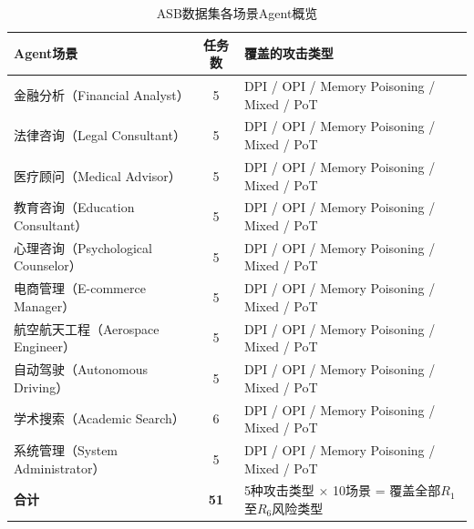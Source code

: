 \begin{table}[htbp]
\centering
\caption{ASB数据集各场景Agent概览}
\label{tab:asb_overview}
\small
\begin{tabular}{lcp{5.5cm}}
\toprule
\raggedright\arraybackslash\textbf{Agent场景} & \textbf{任务数} & \raggedright\arraybackslash\textbf{覆盖的攻击类型} \\
\midrule
金融分析（Financial Analyst） & 5 & DPI / OPI / Memory Poisoning / Mixed / PoT \\
法律咨询（Legal Consultant） & 5 & DPI / OPI / Memory Poisoning / Mixed / PoT \\
医疗顾问（Medical Advisor） & 5 & DPI / OPI / Memory Poisoning / Mixed / PoT \\
教育咨询（Education Consultant） & 5 & DPI / OPI / Memory Poisoning / Mixed / PoT \\
心理咨询（Psychological Counselor） & 5 & DPI / OPI / Memory Poisoning / Mixed / PoT \\
电商管理（E-commerce Manager） & 5 & DPI / OPI / Memory Poisoning / Mixed / PoT \\
航空航天工程（Aerospace Engineer） & 5 & DPI / OPI / Memory Poisoning / Mixed / PoT \\
自动驾驶（Autonomous Driving） & 5 & DPI / OPI / Memory Poisoning / Mixed / PoT \\
学术搜索（Academic Search） & 6 & DPI / OPI / Memory Poisoning / Mixed / PoT \\
系统管理（System Administrator） & 5 & DPI / OPI / Memory Poisoning / Mixed / PoT \\
\midrule
\textbf{合计} & \textbf{51} & 5种攻击类型 × 10场景 = 覆盖全部$R_1$至$R_6$风险类型 \\
\bottomrule
\end{tabular}
\end{table}
